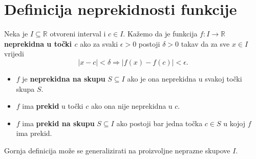 \section{Definicija neprekidnosti funkcije}
\begin{definition}
Neka je \(I\subseteq \mathbb{R}\) otvoreni interval i \(c\in I\). Kažemo da je funkcija \(f : I\to \mathbb{R}\) \textbf{neprekidna u točki \(c\)} ako za svaki \(\epsilon>0\) postoji \(\delta>0\) takav da za sve \(x\in I\) vrijedi 
\[|x-c|<\delta\Rightarrow |f(x)-f(c)|<\epsilon.\]
\begin{itemize}
\item \(f\) je \textbf{neprekidna na skupu} \(S\subseteq I\) ako je ona neprekidna u svakoj točki skupa \(S\).
\item \(f\) ima \textbf{prekid} u točki \(c\) ako ona nije neprekidna u \(c\).
\item \(f\) ima \textbf{prekid na skupu} \(S\subseteq I\) ako postoji bar jedna točka \(c\in S\) u kojoj \(f\) ima prekid.
\end{itemize}
\end{definition}

\begin{remark}
Gornja definicija može se generalizirati na proizvoljne neprazne skupove \(I\).
\end{remark}

